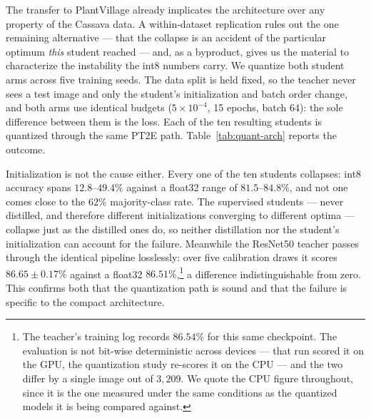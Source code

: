 \documentclass[conference]{IEEEtran}
\begin{document}
\begin{table}
  \centering
  \caption{Mixed-precision post-training quantization on the Cassava test set,
  over five distilled students $\times$ five calibration draws (mean~$\pm$~SD
  across students). Keeping the two sensitive blocks in float32 recovers
  full-precision accuracy at $0.08\%$ of parameters, with no retraining.}
  \label{tab:mixed-ptq}
\end{table}

The transfer to PlantVillage already implicates the architecture over any
property of the Cassava data. A within-dataset replication rules out the one
remaining alternative --- that the collapse is an accident of the particular
optimum \emph{this} student reached --- and, as a byproduct, gives us the
material to characterize the instability the int8 numbers carry. We quantize both
student arms across five training seeds. The data split is held fixed, so the
teacher never sees a test image and only the student's initialization and batch
order change, and both arms use identical budgets ($5\times10^{-4}$, 15 epochs,
batch 64): the sole difference between them is the loss. Each of the ten
resulting students is quantized through the same PT2E path.
Table~\ref{tab:quant-arch} reports the outcome.

Initialization is not the cause either. Every one of the ten students collapses:
int8 accuracy spans $12.8$--$49.4\%$ against a float32 range of $81.5$--$84.8\%$,
and not one comes close to the $62\%$ majority-class rate. The supervised students
--- never distilled, and therefore different initializations converging to
different optima --- collapse just as the distilled ones do, so neither
distillation nor the student's initialization can account for the failure. Meanwhile the
ResNet50 teacher passes through the identical pipeline losslessly: over five
calibration draws it scores $86.65\pm0.17\%$ against a float32
$86.51\%$,\footnote{The teacher's training log records $86.54\%$ for this same
checkpoint. The evaluation is not bit-wise deterministic across devices --- that
run scored it on the GPU, the quantization study re-scores it on the CPU --- and
the two differ by a single image out of $3{,}209$. We quote the CPU figure
throughout, since it is the one measured under the same conditions as the
quantized models it is being compared against.} a
difference indistinguishable from zero. This confirms both that the quantization
path is sound and that the failure is specific to the compact architecture.
\end{document}
